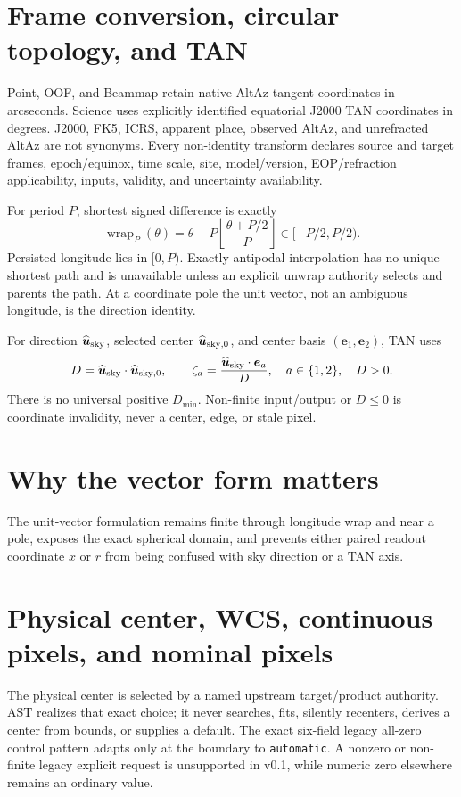 \documentclass[10pt]{article}
\begin{document}
\newpage
\section{Frame conversion, circular topology, and TAN}
Point, OOF, and Beammap retain native AltAz tangent coordinates in arcseconds.
Science uses explicitly identified equatorial J2000 TAN coordinates in
degrees. J2000, FK5, ICRS, apparent place, observed AltAz, and unrefracted
AltAz are not synonyms. Every non-identity transform declares source and
target frames, epoch/equinox, time scale, site, model/version,
EOP/refraction applicability, inputs, validity, and uncertainty availability.

For period $P$, shortest signed difference is exactly
\begin{equation*}
 \operatorname{wrap}_P(\theta)=
 \theta-P\left\lfloor\frac{\theta+P/2}{P}\right\rfloor
 \in[-P/2,P/2).
\end{equation*}
Persisted longitude lies in $[0,P)$. Exactly antipodal interpolation has no
unique shortest path and is unavailable unless an explicit unwrap authority
selects and parents the path. At a coordinate pole the unit vector, not an
ambiguous longitude, is the direction identity.

For direction $\widehat{\boldsymbol u}_{\rm sky}$, selected center
$\widehat{\boldsymbol u}_{\rm sky,0}$, and center basis
$(\boldsymbol e_1,\boldsymbol e_2)$, TAN uses
\begin{equation*}
 D=\widehat{\boldsymbol u}_{\rm sky}\cdot
 \widehat{\boldsymbol u}_{\rm sky,0},\qquad
 \zeta_a=\frac{\widehat{\boldsymbol u}_{\rm sky}\cdot\boldsymbol e_a}{D},
 \quad a\in\{1,2\},\quad D>0.
\end{equation*}
There is no universal positive $D_{\min}$. Non-finite input/output or
$D\leq0$ is coordinate invalidity, never a center, edge, or stale pixel.

\section*{Why the vector form matters}
The unit-vector formulation remains finite through longitude wrap and near a
pole, exposes the exact spherical domain, and prevents either paired readout
coordinate $x$ or $r$ from being confused with sky direction or a TAN axis.

\newpage
\section{Physical center, WCS, continuous pixels, and nominal pixels}
The physical center is selected by a named upstream target/product authority.
AST realizes that exact choice; it never searches, fits, silently recenters,
derives a center from bounds, or supplies a default. The exact six-field
legacy all-zero control pattern adapts only at the boundary to
\texttt{automatic}. A nonzero or non-finite legacy explicit request is
unsupported in v0.1, while numeric zero elsewhere remains an ordinary value.
\end{document}
